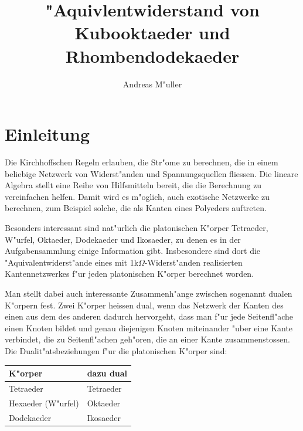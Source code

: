 \documentclass[a4paper,12pt]{article}
\begin{document}
\title{"Aquivlentwiderstand von Kubooktaeder und Rhombendodekaeder}
\author{Andreas M"uller}
\date{}
\maketitle
\section{Einleitung}
Die Kirchhoffschen Regeln erlauben, die Str"ome zu berechnen,
die in einem beliebige Netzwerk von Widerst"anden und Spannungsquellen fliessen.
Die lineare Algebra stellt eine Reihe von Hilfsmitteln bereit, die
die Berechnung zu vereinfachen helfen.
Damit wird es m"oglich, auch exotische Netzwerke zu berechnen, zum Beispiel
solche, die als Kanten eines Polyeders auftreten.

Besonders interessant sind nat"urlich die platonischen K"orper Tetraeder, W"urfel,
Oktaeder, Dodekaeder und Ikosaeder, zu denen es in der Aufgabensammlung
einige Information gibt.
Insbesondere sind dort die "Aquivalentwiderst"ande eines mit
1k$\Omega$-Widerst"anden realisierten Kantennetzwerkes f"ur jeden 
platonischen K"orper berechnet worden.

Man stellt dabei auch interessante Zusammenh"ange zwischen sogenannt dualen
K"orpern fest.
Zwei K"orper heissen dual, wenn das Netzwerk der Kanten des einen aus dem des anderen
dadurch hervorgeht, dass man f"ur jede Seitenfl"ache einen Knoten bildet
und genau diejenigen Knoten miteinander "uber eine Kante verbindet, die zu
Seitenfl"achen geh"oren, die an einer Kante zusammenstossen.
Die Dualit"atsbeziehungen f"ur die platonischen K"orper sind:
\begin{center}
\begin{tabular}{ll}
\hline
K"orper&dazu dual\\
\hline
Tetraeder&Tetraeder\\
Hexaeder (W"urfel)&Oktaeder\\
Dodekaeder&Ikosaeder\\
\hline
\end{tabular}
\end{center}
\end{document}
